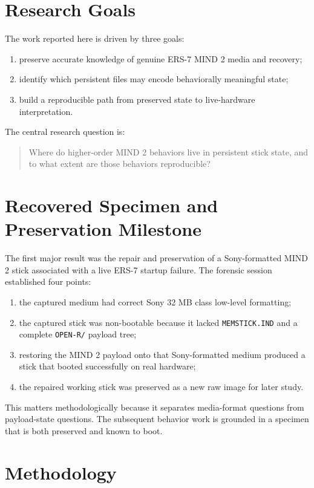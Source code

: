 \documentclass[11pt]{article}
\begin{document}
\section{Research Goals}
The work reported here is driven by three goals:
\begin{enumerate}[leftmargin=*]
\item preserve accurate knowledge of genuine ERS-7 MIND 2 media and recovery;
\item identify which persistent files may encode behaviorally meaningful state;
\item build a reproducible path from preserved state to live-hardware
interpretation.
\end{enumerate}

The central research question is:

\begin{quote}
Where do higher-order MIND 2 behaviors live in persistent stick state, and to
what extent are those behaviors reproducible?
\end{quote}

\section{Recovered Specimen and Preservation Milestone}
The first major result was the repair and preservation of a Sony-formatted MIND
2 stick associated with a live ERS-7 startup failure. The forensic session
established four points:
\begin{enumerate}[leftmargin=*]
\item the captured medium had correct Sony 32 MB class low-level formatting;
\item the captured stick was non-bootable because it lacked
\texttt{MEMSTICK.IND} and a complete \texttt{OPEN-R/} payload tree;
\item restoring the MIND 2 payload onto that Sony-formatted medium produced a
stick that booted successfully on real hardware;
\item the repaired working stick was preserved as a new raw image for later
study.
\end{enumerate}

This matters methodologically because it separates media-format questions from
payload-state questions. The subsequent behavior work is grounded in a specimen
that is both preserved and known to boot.

\section{Methodology}
\end{document}
